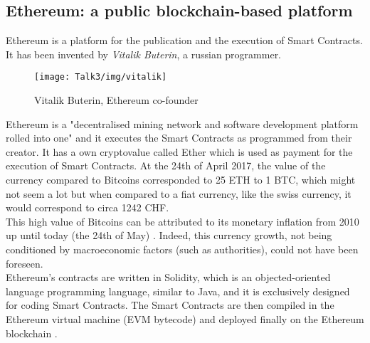 \subsection{Ethereum: a public blockchain-based platform}
Ethereum is a platform for the publication and the execution of Smart Contracts.
It has been invented by \textit{Vitalik Buterin}, a russian programmer. 
           \begin{figure}[H]
         \begin{center}
         \texttt{[image: Talk3/img/vitalik]}
         \end{center}
         \caption{Vitalik Buterin, Ethereum co-founder}
         \label{label}
       \end{figure}


Ethereum is a "decentralised mining network and software development platform rolled into one" \cite{vitalin} and it executes the Smart Contracts as programmed from their creator.
It has a own cryptovalue called Ether which is used as payment for the execution of Smart Contracts.
At the 24th of April 2017, the value of the currency compared to Bitcoins corresponded to 25 ETH to 1 BTC, which might not seem a lot but when compared to a fiat currency, like the swiss currency, it would correspond to circa 1242 CHF.\\
This high value of Bitcoins can be attributed to its monetary inflation from 2010 up until today (the 24th of May) \cite{BitcoinsPriceCharts}. Indeed, this currency growth, not being conditioned by macroeconomic factors (such as authorities), could not have been foreseen. \\
Ethereum's contracts are written in Solidity, which is an objected-oriented language programming language, similar to Java, and it is exclusively designed for coding Smart Contracts.
The Smart Contracts are then compiled in the Ethereum virtual machine (EVM bytecode) and deployed finally on the Ethereum blockchain \cite{paper2}. 

